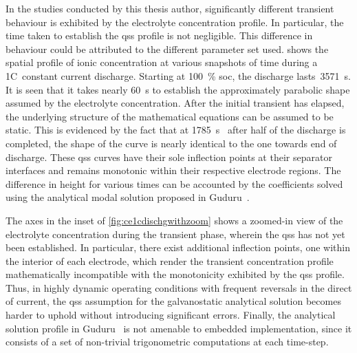 In  the  studies  conducted  by  this  thesis  author,  significantly  different
transient  behaviour  is exhibited  by  the  electrolyte concentration  profile.
In  particular,  the time  taken  to  establish  the  \gls{qss} profile  is  not
negligible. This  difference in behaviour  could be attributed to  the different
parameter  set used.    shows  the spatial  profile
of  ionic  concentration at  various  snapshots  of  time during  a  1C~constant
current  discharge.  Starting  at \SI{100}{\percent}  \gls{soc},  the  discharge
lasts~\SI{3571}{\second}.  It  is seen  that  it  takes nearly  \SI{60}{\second}
to  establish  the approximately  parabolic  shape  assumed by  the  electrolyte
concentration. After the initial transient has elapsed, the underlying structure
of the mathematical equations can be assumed  to be static. This is evidenced by
the  fact  that  at  \SI{1785}{\second}  \ie~after  half  of  the  discharge  is
completed, the shape of the curve is  nearly identical to the one towards end of
discharge. These  \gls{qss} curves  have their sole  inflection points  at their
separator  interfaces and  remains monotonic  within their  respective electrode
regions.  The  difference in  height  for  various  times  can be  accounted  by
the  coefficients  solved  using  the  analytical  modal  solution  proposed  in
Guduru~\etal{}.

The  axes  in  the  inset of  \cref{fig:ce1cdischgwithzoom}  shows  a  zoomed-in
view  of  the electrolyte  concentration  during  the transient  phase,  wherein
the  \gls{qss}  has  not  yet  been  established.  In  particular,  there  exist
additional inflection points,  one within the interior of  each electrode, which
render the transient concentration  profile mathematically incompatible with the
monotonicity  exhibited  by  the  \gls{qss} profile.  Thus,  in  highly  dynamic
operating  conditions with  frequent reversals  in  the direct  of current,  the
\gls{qss} assumption for the galvanostatic analytical solution becomes harder to
uphold without introducing significant  errors. Finally, the analytical solution
profile in Guduru~\etal{}  is not amenable to embedded  implementation, since it
consists of a set of non-trivial trigonometric computations at each time-step.

